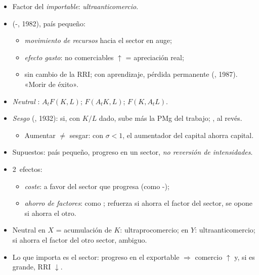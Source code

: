 \documentclass{article}
\begin{document}
\begin{columnas}
\begin{itemize}
  \begin{itemize}
  \item Corea, 60-90: $K/L\uparrow$ (, 1995) $\Rightarrow$ acero, barcos, automóviles.
  \end{itemize}
\item Factor del \emph{importable}: \emph{ultraanticomercio}.
\item {} (-, 1982), país pequeño:
  \begin{itemize}
  \item \emph{movimiento de recursos} hacia el sector en auge;
  \item \emph{efecto gasto}: no comerciables $\uparrow$ = apreciación real;
  \item sin cambio de la RRI; con aprendizaje, pérdida permanente (, 1987). «Morir de éxito».
  \end{itemize}
\end{itemize}
\begin{itemize}
\item \emph{Neutral} :  $A_tF(K,L)$;  $F(A_tK,L)$;  $F(K,A_tL)$.
\item \emph{Sesgo} (, 1932):  si, con $K/L$ dado, sube más la PMg del trabajo; , al revés.
  \begin{itemize}
  \item Aumentar $\neq$ sesgar: con $\sigma<1$, el aumentador del capital ahorra capital.
  \end{itemize}
\item Supuestos: país pequeño, progreso en un sector, \emph{no reversión de intensidades}.
\item 2~efectos:
  \begin{itemize}
  \item \emph{coste}: a favor del sector que progresa (como -);
  \item \emph{ahorro de factores}: como ; refuerza si ahorra el factor del sector, se opone si ahorra el otro.
  \end{itemize}
\item Neutral en $X$ = acumulación de $K$: ultraprocomercio; en $Y$: ultraanticomercio; si ahorra el factor del otro sector, ambiguo.
\item Lo que importa es el sector: progreso en el exportable $\Rightarrow$ comercio $\uparrow$ y, si es grande, RRI $\downarrow$.
\end{itemize}


\end{columnas}
\end{document}
